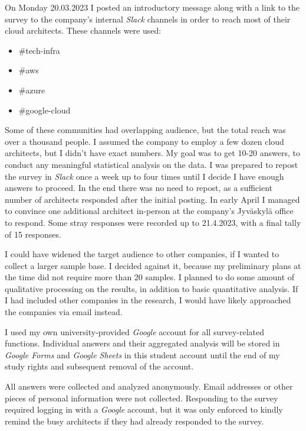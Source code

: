 \documentclass[utf8,english]{gradu3}
\begin{document}
On Monday 20.03.2023 I posted an introductory message along with a link to the
survey to the company's internal \textit{Slack} channels in order to reach most
of their cloud architects. These channels were used:
\begin{itemize}
  \item \#tech-infra
  \item \#aws
  \item \#azure
  \item \#google-cloud
\end{itemize}

Some of these communities had overlapping audience, but the total reach was over
a thousand people.  I assumed the company to employ a few dozen cloud
architects, but I didn't have exact numbers.  My goal was to get 10-20 answers,
to conduct any meaningful statistical analysis on the data.  I was prepared to
repost the survey in \textit{Slack} once a week up to four times until I decide
I have enough answers to proceed.  In the end there was no need to repost, as a
sufficient number of architects responded after the initial posting.  In early
April I managed to convince one additional architect in-person at the company's
Jyväskylä office to respond.  Some stray responses were recorded up to
21.4.2023, with a final tally of 15 responses.

I could have widened the target audience to other companies, if I wanted to
collect a larger sample base.  I decided against it, because my preliminary
plans at the time did not require more than 20 samples.  I planned to do some
amount of qualitative processing on the results, in addition to basic
quantitative analysis.  If I had included other companies in the research, I
would have likely approached the companies via email instead.

I used my own university-provided \textit{Google} account for all survey-related
functions. Individual answers and their aggregated analysis will be stored in
\textit{Google Forms} and \textit{Google Sheets} in this student account until
the end of my study rights and subsequent removal of the account.

All answers were collected and analyzed anonymously. Email addresses or other
pieces of personal information were not collected. Responding to the survey
required logging in with a \textit{Google} account, but it was only enforced to
kindly remind the busy architects if they had already responded to the survey.


\end{document}

